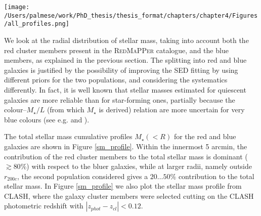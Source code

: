 {\begin{figure*}
\texttt{[image: /Users/palmese/work/PhD\_thesis/thesis\_format/chapters/chapter4/Figures/all\_profiles.png]}
\caption{Cumulative radial distributions of total stellar mass for the DES red (red points), blue (blue points) and all galaxies (purple points) in the cluster, together with the total, non-parametric mass profile reconstructed from DES weak lensing (\citealt{melchior}, green points). The purple solid line is our NFW fit to the DES stellar mass profile, while the blue solid line is the NFW best fit from DES weak lensing. The black points represent the CLASH total stellar mass profile computed in this work, with our NFW fit (black solid line). The red solid line is the \citet{umetsu15} NFW best-fit for CLASH from a strong lensing, weak lensing and magnification joint analysis. This profile is restricted to the NFW fitting range $R<2 {\rm Mpc }\; h^{-1}$ chosen in \citet{umetsu15}, which is larger than the HST field of view as other datasets were used in a joint analysis. The radius $R$ is projected, and $r_{200c}=2.2$ Mpc. Errorbars show the 68\% confidence level. }\label{sm_profile}
\end{figure*}

We look at the radial distribution of stellar mass, taking into account both the red cluster members present in the \textsc{RedMaPPer} catalogue, and the blue members, as explained in the previous section. The splitting into red and blue galaxies is justified by the possibility of improving the SED fitting by using different priors for the two populations, and considering the systematics differently. In fact, it is well known that stellar masses estimated for quiescent galaxies are more reliable than for star-forming ones, partially because the colour--$M_\star/L$ (from which $M_\star$ is derived) relation are more uncertain for very blue colours (see e.g. \citealt{conroy} and \citealt{banerji}).

The total stellar mass cumulative profiles $M_\star(<R)$ for the red and blue galaxies are shown in Figure \ref{sm_profile}. Within the innermost 5 arcmin, the contribution of the red cluster members to the total stellar mass is dominant ($\gtrsim 80\%$) with respect to the bluer galaxies, while at larger radii, namely outside $r_{200c}$, the second population considered gives a $20\ldots 50\%$ contribution to the total stellar mass.
In Figure \ref{sm_profile} we also plot the stellar mass profile from CLASH, where the galaxy cluster members were selected cutting on the CLASH photometric redshift with $|z_{phot}-z_{cl}|<0.12$.
 
}
